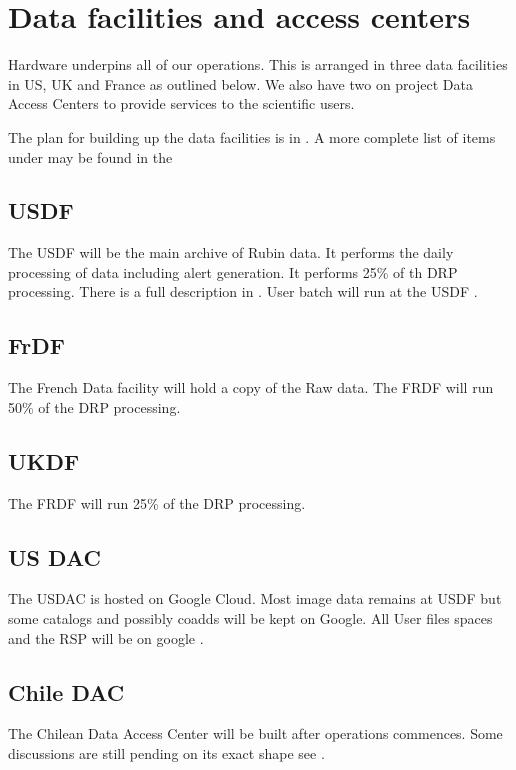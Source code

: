 \section{Data facilities and access centers} \label{sec:datafacilities}
Hardware underpins all of our operations.
This is arranged in three data facilities in US, UK and France as outlined below.
We also have two on project Data Access Centers to provide services to the scientific users.

The plan for building up the data facilities is in .
A more complete list of items under may be found in the 

\subsection{USDF}
The USDF will be the main archive of Rubin data. It performs the daily processing of data including alert generation.
It performs 25\% of th DRP processing.
There is a full description in .
User batch will run at the USDF .

\subsection{FrDF}
The French Data facility will hold a copy of the Raw data.
The FRDF will run 50\% of the DRP processing.

\subsection{UKDF}
The FRDF will run 25\% of the DRP processing.

\subsection{US DAC}
The USDAC is hosted on Google Cloud.
Most image data remains at USDF but some catalogs and possibly coadds will be kept on Google.
All User files spaces and the RSP will be on google .

\subsection{Chile DAC}

The Chilean Data Access Center will be built after operations commences.
Some discussions are still pending on its exact shape see .

